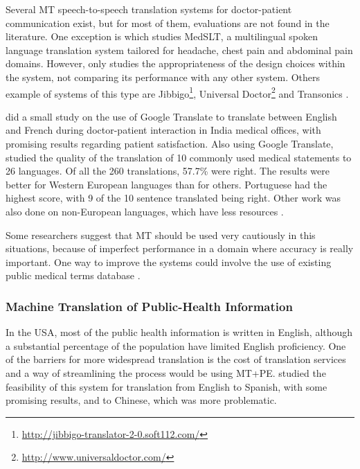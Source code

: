 Several MT speech-to-speech translation systems for doctor-patient communication exist, but for most of them, evaluations are not found in the literature. One exception is \citep{Bouillon2005} which studies MedSLT, a multilingual spoken language translation system tailored for headache, chest pain and abdominal pain domains. However, \citep{Bouillon2005} only studies the appropriateness of the design choices within the system, not comparing its performance with any other system. Others example of systems of this type are Jibbigo\footnote{\url{http://jibbigo-translator-2-0.soft112.com/}}, Universal Doctor\footnote{\url{http://www.universaldoctor.com/}} and Transonics \citep{Nagata2005}.

\citep{Kaliyadan2010} did a small study on the use of Google Translate to translate between English and French during doctor-patient interaction in India medical offices, with promising results regarding patient satisfaction. Also using Google Translate, \citep{Patil2014} studied the quality of the translation of 10 commonly used medical statements to 26 languages. Of all the 260 translations, 57.7\% were right. The results were better for Western European languages than for others. Portuguese had the highest score, with 9 of the 10 sentence translated being right. Other work was also done on non-European languages, which have less resources \citep{Musleh2016, Kathol2005}.

Some researchers \citep{G2013, Conference2012, Kaliyadan2010} suggest that MT should be used very cautiously in this situations, because of imperfect performance in a domain where accuracy is really important. One way to improve the systems could involve the use of existing public medical terms database \citep{Eck2004}.

\subsubsection{Machine Translation of Public-Health Information}

In the USA, most of the public health information is written in English, although a substantial percentage of the population have limited English proficiency. One of the barriers for more widespread translation is the cost of translation services and a way of streamlining the process would be using MT+PE. \citep{Kirchhoff2011, Turner2015} studied the feasibility of this system for translation from English to Spanish, with some promising results, and to Chinese, which was more problematic.

